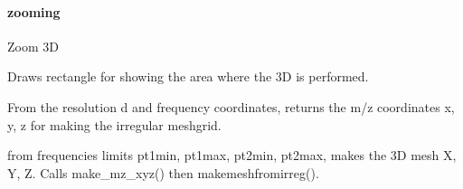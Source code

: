 \documentclass[letterpaper,10pt,openany,oneside]{sphinxmanual}
\begin{document}

\begin{fulllineitems}
\label{rst/visu2d:Visu.profile_popup.profile_popup}
\end{fulllineitems}



\paragraph{zooming}
\label{rst/visu2d:zooming}\label{rst/visu2d:module-Visu.zooming}

\begin{fulllineitems}
\label{rst/visu2d:Visu.zooming.ZOOM3D}
Zoom 3D

\begin{fulllineitems}
\label{rst/visu2d:Visu.zooming.ZOOM3D.drawrect}
Draws rectangle for showing the area where the 3D is performed.

\end{fulllineitems}


\begin{fulllineitems}
\label{rst/visu2d:Visu.zooming.ZOOM3D.make_mz_xyz}
From the resolution d and frequency coordinates,
returns the m/z coordinates x, y, z for making the irregular meshgrid.

\end{fulllineitems}


\begin{fulllineitems}
\label{rst/visu2d:Visu.zooming.ZOOM3D.makemesh}
from frequencies limits pt1min, pt1max, pt2min, pt2max, makes the 3D mesh X, Y, Z.
Calls make\_mz\_xyz() then makemeshfromirreg().


\end{fulllineitems}
\end{fulllineitems}
\end{document}
